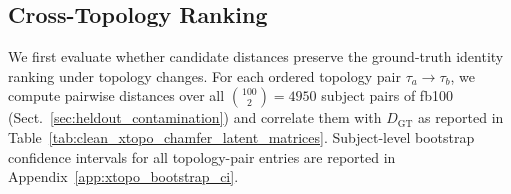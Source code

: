\documentclass[10pt,twocolumn,letterpaper]{article}
\begin{document}


\subsection{Cross-Topology Ranking}
\label{sec:xtopo_results}
We first evaluate whether candidate distances preserve the ground-truth identity ranking under topology changes. For each ordered topology pair $\tau_a \rightarrow \tau_b$, we compute pairwise distances over all $\binom{100}{2}=4950$ subject pairs of fb100 (Sect.~\ref{sec:heldout_contamination}) and correlate them with $D_{\mathrm{GT}}$ as reported in Table~\ref{tab:clean_xtopo_chamfer_latent_matrices}. Subject-level bootstrap confidence intervals for all topology-pair entries are reported in Appendix~\ref{app:xtopo_bootstrap_ci}.
\end{document}

